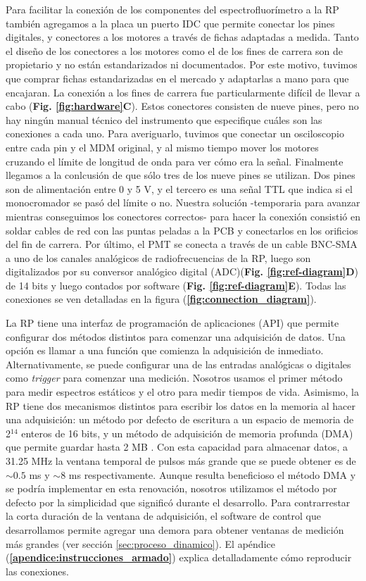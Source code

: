 Para facilitar la conexión de los componentes del espectrofluorímetro a la RP también agregamos a la placa un puerto IDC que permite conectar los pines digitales, y conectores a los motores a través de fichas adaptadas a medida.
Tanto el diseño de los conectores a los motores como el de los fines de carrera son de propietario y no están estandarizados ni documentados.
Por este motivo, tuvimos que comprar fichas estandarizadas en el mercado y adaptarlas a mano para que encajaran.
La conexión a los fines de carrera fue particularmente difícil de llevar a cabo (\textbf{Fig. \ref{fig:hardware}C}).
Estos conectores consisten de nueve pines, pero no hay ningún manual técnico del instrumento que especifique cuáles son las conexiones a cada uno.
Para averiguarlo, tuvimos que conectar un osciloscopio entre cada pin y el MDM original, y al mismo tiempo mover los motores cruzando el límite de longitud de onda para ver cómo era la señal.
Finalmente llegamos a la conlcusión de que sólo tres de los nueve pines se utilizan. 
Dos pines son de alimentación entre 0 y 5 V, y el tercero es una señal TTL que indica si el monocromador se pasó del límite o no.
Nuestra solución -temporaria para avanzar mientras conseguimos los conectores correctos- para hacer la conexión consistió en soldar cables de red con las puntas peladas a la PCB y conectarlos en los orificios del fin de carrera.
Por último, el PMT se conecta a través de un cable BNC-SMA a uno de los canales analógicos de radiofrecuencias de la RP, luego son digitalizados por su conversor analógico digital (ADC)(\textbf{Fig. \ref{fig:ref-diagram}D}) de 14 bits y luego contados por software (\textbf{Fig. \ref{fig:ref-diagram}E}).
Todas las conexiones se ven detalladas en la figura (\textbf{\ref{fig:connection_diagram}}).

La RP tiene una interfaz de programación de aplicaciones (API) que permite configurar dos métodos distintos para comenzar una adquisición de datos.
Una opción es llamar a una función que comienza la adquisición de inmediato.
Alternativamente, se puede configurar una de las entradas analógicas o digitales como \textit{trigger} para comenzar una medición.
Nosotros usamos el primer método para medir espectros estáticos y el otro para medir tiempos de vida.
Asimismo, la RP tiene dos mecanismos distintos para escribir los datos en la memoria al hacer una adquisición: un método por defecto de escritura a un espacio de memoria de 2$^{14}$ enteros de 16 bits, y un método de adquisición de memoria profunda (DMA) que permite guardar hasta 2 MB \cite{DMA_rp}.
Con esta capacidad para almacenar datos, a 31.25 MHz la ventana temporal de pulsos más grande que se puede obtener es de $\sim 0.5$ ms y $\sim 8$ ms respectivamente.
Aunque resulta beneficioso el método DMA y se podría implementar en esta renovación, nosotros utilizamos el método por defecto por la simplicidad que significó durante el desarrollo.
Para contrarrestar la corta duración de la ventana de adquisición, el software de control que desarrollamos permite agregar una demora para obtener ventanas de medición más grandes (ver sección \ref{sec:proceso_dinamico}).
El apéndice (\textbf{\ref{apendice:instrucciones_armado}}) explica detalladamente cómo reproducir las conexiones.

